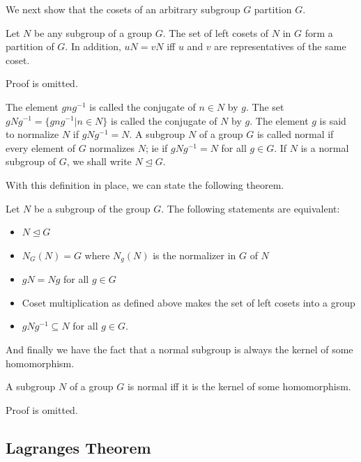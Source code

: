 We next show that the cosets of an arbitrary subgroup $G$ partition $G$.

\begin{theorem}
Let $N$ be any subgroup of a group $G$. The set of left cosets of $N$ in $G$ form a partition of $G$. In addition, $uN = vN$ iff $u$ and $v$ are representatives of the same coset.
\end{theorem}

Proof is omitted.

\begin{definition}
The element $gng^{-1}$ is called the conjugate of $n\in N$ by $g$. The set $gNg^{-1} = \{ gng^{-1} | n \in N \}$ is called the conjugate of $N$ by $g$. The element $g$ is said to normalize $N$ if $gNg^{-1} = N$. A subgroup $N$ of a group $G$ is called normal if every element of $G$ normalizes $N$; ie if $gNg^{-1} = N$ for all $g \in G$. If $N$ is a normal subgroup of $G$, we shall write $N \unlhd G$.
\end{definition}

With this definition in place, we can state the following theorem.

\begin{theorem}
Let $N$ be a subgroup of the group $G$. The following statements are equivalent:

\begin{itemize}
	\item $N \unlhd G$
	\item $N_G(N) = G$ where $N_g(N)$ is the normalizer in $G$ of $N$
	\item $gN = Ng$ for all $g \in G$
	\item Coset multiplication as defined above makes the set of left cosets into a group
	\item $gNg^{-1} \subseteq N$ for all $g \in G$.
\end{itemize}
\end{theorem}

And finally we have the fact that a normal subgroup is always the kernel of some homomorphism.

\begin{theorem}
A subgroup $N$ of a group $G$ is normal iff it is the kernel of some homomorphism.
\end{theorem}

Proof is omitted.

\subsection{Lagranges Theorem}

